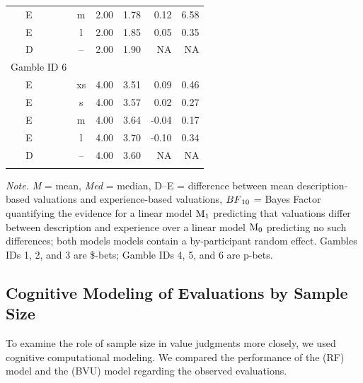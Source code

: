 \documentclass[a4paper, man, floatsintext]{apa6}
\begin{document}
\begin{table}[tbp]
\begin{center}
\begin{threeparttable}
\begin{tabular}{lcccrr}
\ \ \ E & m & 2.00 & 1.78 & 0.12 & 6.58\\
\ \ \ E & l & 2.00 & 1.85 & 0.05 & 0.35\\
\ \ \ D & -- & 2.00 & 1.90 & NA & NA\\
Gamble ID 6 &  &  &  &  & \\
\ \ \ E & xs & 4.00 & 3.51 & 0.09 & 0.46\\
\ \ \ E & s & 4.00 & 3.57 & 0.02 & 0.27\\
\ \ \ E & m & 4.00 & 3.64 & -0.04 & 0.17\\
\ \ \ E & l & 4.00 & 3.70 & -0.10 & 0.34\\
\ \ \ D & -- & 4.00 & 3.60 & NA & NA\\
\bottomrule
\addlinespace
\end{tabular}
\begin{tablenotes}[para]
\normalsize{\textit{Note.} \textit{M} = mean, \textit{Med} = median, D--E = difference between mean description-based valuations and experience-based valuations, $BF\textsubscript{10}$ = Bayes Factor quantifying the evidence for a linear model $\mathrm{M}\textsubscript{1}$ predicting that valuations differ between description and experience over a linear model $\mathrm{M}\textsubscript{0}$ predicting no such differences; both models models contain a by-participant random effect. Gambles IDs 1, 2, and 3 are \$-bets; Gamble IDs 4, 5, and 6 are p-bets.}
\end{tablenotes}
\end{threeparttable}
\end{center}
\end{table}

\subsection{Cognitive Modeling of Evaluations by Sample Size}

To examine the role of sample size in value judgments more closely, we
used cognitive computational modeling. We compared the performance of
the  (RF) model and the
 (BVU) model regarding the observed
evaluations.
\end{document}
